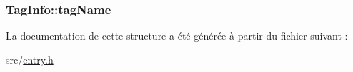 \subsubsection[{tag\+Name}]{ Tag\+Info\+::tag\+Name}\label{struct_tag_info_a8f42f0aff3cb6df860f7b5ba27f6cd2f}


La documentation de cette structure a été générée à partir du fichier suivant \+:\begin{DoxyCompactItemize}
\item 
src/\hyperlink{entry_8h}{entry.\+h}\end{DoxyCompactItemize}
